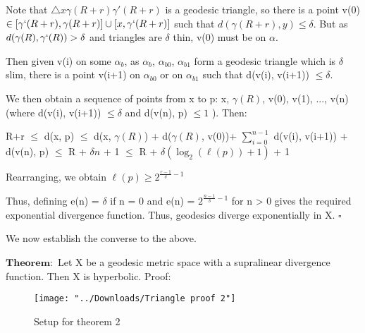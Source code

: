 \documentclass[11pt]{article}
\newcommand{\vs}{\vskip10pt}
\begin{document}
	Note that $\triangle x \gamma(R+r) \gamma'(R+r)$ is a geodesic triangle, so there is a point v(0) $\in [\gamma`(R+r), \gamma(R+r)] \cup [x, \gamma`(R+r)]$ such that $d(\gamma(R+r), y) \leq \delta$. But as $d(\gamma(R), \gamma`(R)) > \delta $ and triangles are $\delta$ thin, v(0) must be on $\alpha$. 
	
	Then given v(i) on some $\alpha_{b}$, as $\alpha_{b}$, $\alpha_{b0}$, $\alpha_{b1}$ form a geodesic triangle which is $\delta $ slim, there is a point v(i+1) on $\alpha_{b0}$ or on $\alpha_{b1}$ such that d(v(i), v(i+1)) $\leq \delta$. 
	
	We then obtain a sequence of points from x to p: x, $\gamma(R)$, v(0), v(1), ..., v(n) (where d(v(i), v(i+1)) $\leq \delta$ and d(v(n), p) $\leq 1$ ). Then: 
	
	R+r 
	$\leq$ d(x, p) 
	$\leq$ d(x, $\gamma(R)$) + d($\gamma(R)$, v(0))+ $\sum_{i=0}^{n-1}$ d(v(i), v(i+1)) + d(v(n), p)
	 $\leq$ R + $\delta n$ + 1
	 $\leq$ R + $\delta (\log_2(\ell(p))+1)$ + 1
	 
	 Rearranging, we obtain $\ell(p) \geq 2^{\frac{r-1}{\delta} - 1}$
	 
	 Thus, defining e(n) = $\delta$ if n = 0 and e(n) = $2^{\frac{n-1}{\delta} - 1}$ for n > 0 gives the required exponential divergence function. Thus, geodesics diverge exponentially in X. 
	 $\square$
	  
	\vs 
	 
 	We now establish the converse to the above.
 	\vs
 	
 	$\mathbf{Theorem: }$ Let X be a geodesic metric space with a supralinear divergence function. Then X is hyperbolic. 
 	\vs
 	Proof: 
 	
 		\begin{figure}[h]
 		\centering
 		\texttt{[image: "../Downloads/Triangle proof 2"]}
 		\caption{Setup for theorem 2}
 		\label{Figure 2: Setup for theorem 2}
 		
 	\end{figure}
 	
\end{document}
